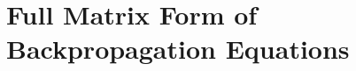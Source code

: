 \section{Full Matrix Form of Backpropagation Equations}
\label{sec:mlp_backprop:full_matrix_form_of_backpropagation_equations}

